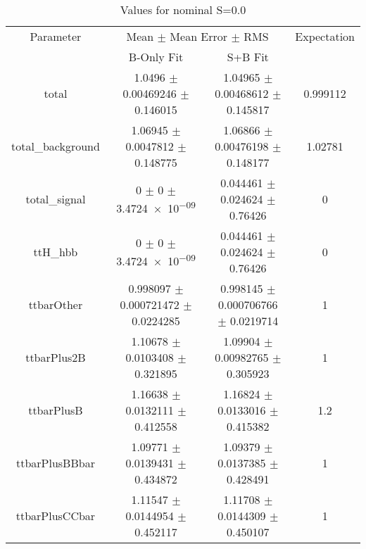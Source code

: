 \begin{table}
\centering
\caption{Values for nominal S=0.0}
\begin{tabular}{cccc}
\toprule
Parameter & \multicolumn{2}{c}{Mean $\pm$ Mean Error $\pm$ RMS} & Expectation\\
 & B-Only Fit & S+B Fit & \\
\midrule
total & \num{1.0496} $\pm$ \num{0.00469246} $\pm$ \num{0.146015} & \num{1.04965} $\pm$ \num{0.00468612} $\pm$ \num{0.145817} & \num{0.999112}\\
total\_background & \num{1.06945} $\pm$ \num{0.0047812} $\pm$ \num{0.148775} & \num{1.06866} $\pm$ \num{0.00476198} $\pm$ \num{0.148177} & \num{1.02781}\\
total\_signal & \num{0} $\pm$ \num{0} $\pm$ \num{3.4724e-09} & \num{0.044461} $\pm$ \num{0.024624} $\pm$ \num{0.76426} & \num{0}\\
ttH\_hbb & \num{0} $\pm$ \num{0} $\pm$ \num{3.4724e-09} & \num{0.044461} $\pm$ \num{0.024624} $\pm$ \num{0.76426} & \num{0}\\
ttbarOther & \num{0.998097} $\pm$ \num{0.000721472} $\pm$ \num{0.0224285} & \num{0.998145} $\pm$ \num{0.000706766} $\pm$ \num{0.0219714} & \num{1}\\
ttbarPlus2B & \num{1.10678} $\pm$ \num{0.0103408} $\pm$ \num{0.321895} & \num{1.09904} $\pm$ \num{0.00982765} $\pm$ \num{0.305923} & \num{1}\\
ttbarPlusB & \num{1.16638} $\pm$ \num{0.0132111} $\pm$ \num{0.412558} & \num{1.16824} $\pm$ \num{0.0133016} $\pm$ \num{0.415382} & \num{1.2}\\
ttbarPlusBBbar & \num{1.09771} $\pm$ \num{0.0139431} $\pm$ \num{0.434872} & \num{1.09379} $\pm$ \num{0.0137385} $\pm$ \num{0.428491} & \num{1}\\
ttbarPlusCCbar & \num{1.11547} $\pm$ \num{0.0144954} $\pm$ \num{0.452117} & \num{1.11708} $\pm$ \num{0.0144309} $\pm$ \num{0.450107} & \num{1}\\
\bottomrule
\end{tabular}
\end{table}